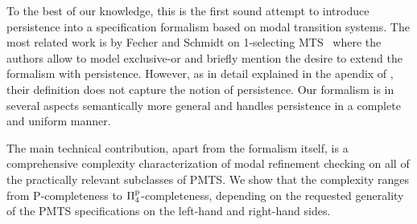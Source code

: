 To the best of our knowledge, this is the first sound attempt to introduce
persistence into a specification formalism based on modal transition systems.
The most related work is by Fecher and Schmidt 
on 1-selecting MTS~\cite{FS:JLAP:08} where the authors
allow to model exclusive-or and briefly mention the desire %
to extend the formalism with persistence. However, 
as in detail explained in the apendix of
\cite{pmts-techrep},
their definition does not capture the %
notion of persistence.
Our formalism is in several aspects semantically more general and handles persistence
in a complete and uniform manner.

The main technical contribution, apart from the formalism itself, 
is a comprehensive complexity   characterization   of modal refinement 
checking on all of the practically relevant subclasses of PMTS. 
We show that the complexity ranges from P-completeness to 
$\mathrm\Pi^\mathrm p_4$-completeness, depending on the requested generality of the PMTS specifications 
on the left-hand and right-hand sides.


